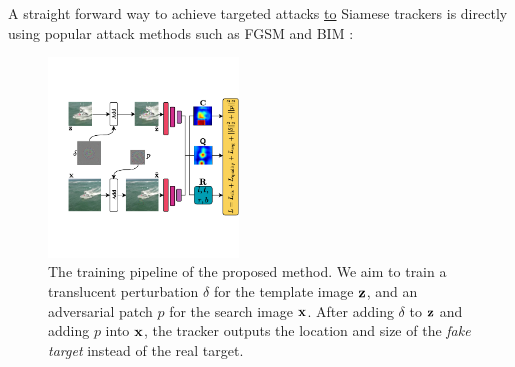\documentclass[journal]{IEEEtran}
\begin{document}
A straight forward way to achieve targeted attacks \uline{to} Siamese trackers is directly using popular attack methods such as FGSM \cite{FGSM} and BIM \cite{DBLP:conf/iclr/KurakinGB17a}:

\begin{figure}[t]
  \centering
  \includegraphics[width=0.45\textwidth]{images_imperceptible/network_v5.pdf}
  \caption{The training pipeline of the proposed method. We aim to train a translucent perturbation $\delta$ for the template image $\textbf z$, and an adversarial patch $p$ for the search image $\textbf x$. After adding $\delta$ to $\textbf z$ and adding $p$ into $\textbf x$, the tracker outputs the location and size of the \textit{fake target} instead of the real target.}
  \label{fig:net}
  \vspace{-3mm}
\end{figure}
\end{document}
